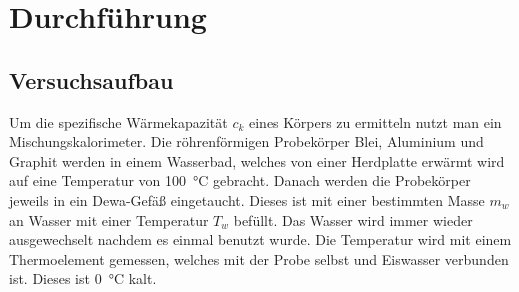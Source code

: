 \documentclass[
  bibliography=totoc,     %
  captions=tableheading,  %
  titlepage=firstiscover, %
]{scrartcl}
\begin{document}
\section{Durchführung}
\label{sec:durchführung}
\subsection{Versuchsaufbau}
Um die spezifische Wärmekapazität $c_k$ eines Körpers zu ermitteln nutzt man ein
Mischungskalorimeter. Die röhrenförmigen Probekörper
Blei, Aluminium und Graphit werden in einem Wasserbad, welches von einer
Herdplatte erwärmt wird auf eine Temperatur von \SI{100}{\celsius} gebracht.
Danach werden die Probekörper jeweils in ein Dewa-Gefäß eingetaucht. Dieses ist
mit einer bestimmten Masse $m_w$ an Wasser mit einer Temperatur $T_w$ befüllt.
Das Wasser wird immer wieder ausgewechselt nachdem es einmal benutzt wurde.
Die Temperatur wird mit einem Thermoelement gemessen, welches mit der Probe
selbst und Eiswasser verbunden ist. Dieses ist \SI{0}{\celsius} kalt.
\end{document}
